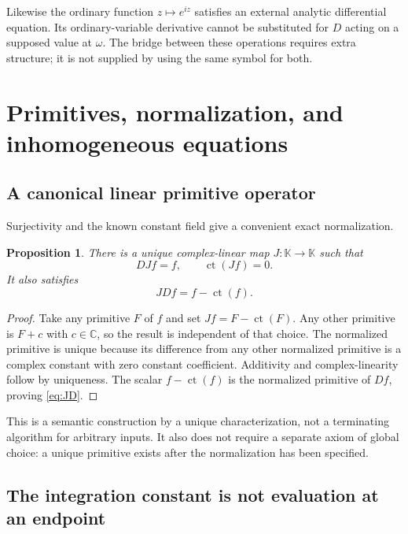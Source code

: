 \documentclass[11pt,a4paper]{article}
\numberwithin{equation}{section}
\newtheorem{proposition}[theorem]{Proposition}
\theoremstyle{definition}
\theoremstyle{remark}
\newcommand{\K}{\mathbb K}
\newcommand{\C}{\mathbb C}
\newcommand{\ct}{\operatorname{ct}}
\begin{document}
Likewise the ordinary function $z\mapsto e^{iz}$ satisfies an external
analytic differential equation. Its ordinary-variable derivative cannot
be substituted for $D$ acting on a supposed value at $\omega$. The bridge
between these operations requires extra structure; it is not supplied by
using the same symbol for both.

\section{Primitives, normalization, and inhomogeneous equations}
\label{sec:primitives}

\subsection{A canonical linear primitive operator}

Surjectivity and the known constant field give a convenient exact
normalization.

\begin{proposition}\label{prop:J}
There is a unique complex-linear map $J:\K\to\K$ such that
\begin{equation}\label{eq:J}
 DJf=f,\qquad \ct(Jf)=0.
\end{equation}
It also satisfies
\begin{equation}\label{eq:JD}
 JDf=f-\ct(f).
\end{equation}
\end{proposition}
\begin{proof}
Take any primitive $F$ of $f$ and set $Jf=F-\ct(F)$. Any other primitive
is $F+c$ with $c\in\C$, so the result is independent of that choice.
The normalized primitive is unique because its difference from any other
normalized primitive is a complex constant with zero constant coefficient.
Additivity and complex-linearity follow by uniqueness. The scalar
$f-\ct(f)$ is the normalized primitive of $Df$, proving \eqref{eq:JD}.
\end{proof}

This is a semantic construction by a unique characterization, not a
terminating algorithm for arbitrary inputs. It also does not require a
separate axiom of global choice: a unique primitive exists after the
normalization has been specified.

\subsection{The integration constant is not evaluation at an endpoint}
\end{document}
